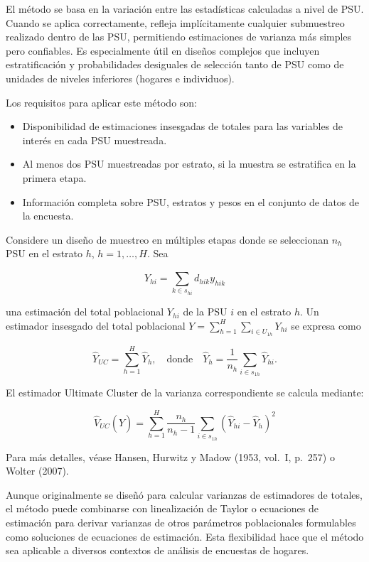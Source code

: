 \documentclass[
  12pt,
]{book}
\providecommand{\tightlist}{%
  \setlength{\itemsep}{0pt}\setlength{\parskip}{0pt}}
\begin{document}
El método se basa en la variación entre las estadísticas calculadas a nivel de PSU. Cuando se aplica correctamente, refleja implícitamente cualquier submuestreo realizado dentro de las PSU, permitiendo estimaciones de varianza más simples pero confiables. Es especialmente útil en diseños complejos que incluyen estratificación y probabilidades desiguales de selección tanto de PSU como de unidades de niveles inferiores (hogares e individuos).

Los requisitos para aplicar este método son:

\begin{itemize}
\tightlist
\item
  Disponibilidad de estimaciones insesgadas de totales para las variables de interés en cada PSU muestreada.
\item
  Al menos dos PSU muestreadas por estrato, si la muestra se estratifica en la primera etapa.
\item
  Información completa sobre PSU, estratos y pesos en el conjunto de datos de la encuesta.
\end{itemize}

Considere un diseño de muestreo en múltiples etapas donde se seleccionan \(n_h\) PSU en el estrato \(h\), \(h=1,\dots,H\). Sea

\[
\hat{Y}_{hi} = \sum_{k\in s_{hi}} d_{hik} y_{hik}
\]

una estimación del total poblacional \(Y_{hi}\) de la PSU \(i\) en el estrato \(h\). Un estimador insesgado del total poblacional \(Y = \sum_{h=1}^H \sum_{i \in U_{1h}} Y_{hi}\) se expresa como

\[
\hat{Y}_{UC} = \sum_{h=1}^H \hat{Y}_h, \quad \text{donde} \quad \hat{Y}_h = \frac{1}{n_h} \sum_{i\in s_{1h}} \hat{Y}_{hi}.
\]

El estimador Ultimate Cluster de la varianza correspondiente se calcula mediante:

\[
\hat{V}_{UC}(\hat{Y}) = \sum_{h=1}^H \frac{n_h}{n_h-1} \sum_{i \in s_{1h}} (\hat{Y}_{hi} - \hat{Y}_h)^2
\]

Para más detalles, véase Hansen, Hurwitz y Madow (1953, vol.~I, p.~257) o Wolter (2007).

Aunque originalmente se diseñó para calcular varianzas de estimadores de totales, el método puede combinarse con linealización de Taylor o ecuaciones de estimación para derivar varianzas de otros parámetros poblacionales formulables como soluciones de ecuaciones de estimación. Esta flexibilidad hace que el método sea aplicable a diversos contextos de análisis de encuestas de hogares.
\end{document}
